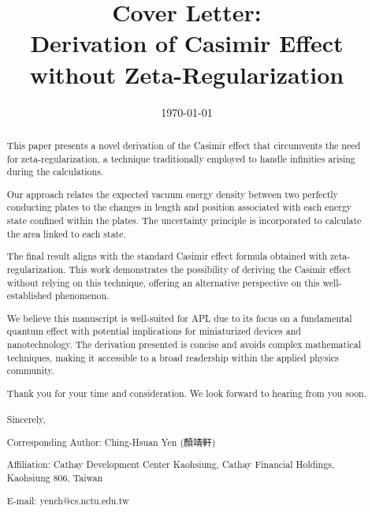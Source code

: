 \documentclass[aip,amsmath,amssymb,reprint]{revtex4-2}
\begin{document}
\title{Cover Letter:\\Derivation of Casimir Effect without Zeta-Regularization}

\date{\today}

\begin{abstract}
This paper presents a novel derivation of the Casimir effect that circumvents the need for zeta-regularization, a technique traditionally employed to handle infinities arising during the calculations. 

Our approach relates the expected vacuum energy density between two perfectly conducting plates to the changes in length and position associated with each energy state confined within the plates. The uncertainty principle is incorporated to calculate the area linked to each state.

The final result aligns with the standard Casimir effect formula obtained with zeta-regularization. This work demonstrates the possibility of deriving the Casimir effect without relying on this technique, offering an alternative perspective on this well-established phenomenon.

We believe this manuscript is well-suited for APL due to its focus on a fundamental quantum effect with potential implications for miniaturized devices and nanotechnology. The derivation presented is concise and avoids complex mathematical techniques, making it accessible to a broad readership within the applied physics community.

Thank you for your time and consideration. We look forward to hearing from you soon.
\\
\\
Sincerely,

\noindent Corresponding Author: Ching-Hsuan Yen (顏靖軒)

\noindent Affiliation: Cathay Development Center Kaohsiung, Cathay Financial Holdings, Kaohsiung 806, Taiwan

\noindent E-mail: yench@cs.nctu.edu.tw

\end{abstract}

\maketitle
\end{document}
